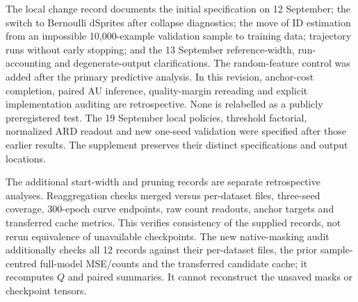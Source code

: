 The local change record documents the initial specification on
12 September; the switch to Bernoulli dSprites after collapse diagnostics;
the move of ID estimation from an impossible 10,000-example validation
sample to training data; trajectory runs without early stopping; and
the 13 September reference-width, run-accounting and degenerate-output
clarifications. The random-feature control was added after the primary
predictive analysis. In this revision, anchor-cost completion, paired AU
inference, quality-margin rereading and explicit implementation auditing
are retrospective. None is relabelled as a publicly preregistered test.
The 19 September local policies, threshold factorial, normalized ARD
readout and new one-seed validation were specified after those earlier
results. The supplement preserves their distinct specifications and
output locations.

The additional start-width and pruning records are separate retrospective
analyses. Reaggregation checks merged versus per-dataset files, three-seed
coverage, 300-epoch curve endpoints, raw count readouts, anchor targets
and transferred cache metrics. This verifies consistency of the supplied
records, not rerun equivalence of unavailable checkpoints. The new
native-masking audit additionally checks all 12 records against their
per-dataset files, the prior sample-centred full-model MSE/counts and
the transferred candidate cache; it recomputes $Q$ and paired summaries.
It cannot reconstruct the unsaved masks or checkpoint tensors.
